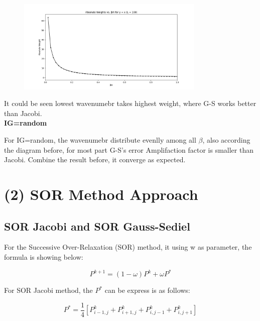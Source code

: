 \documentclass[12pt]{article}
\begin{document}
\begin{figure}[H]
    \centering
    \includegraphics[width=0.8\textwidth]{wavenmubers.png}
    \label{wavenmubers.png}
\end{figure}


It could be seen lowest wavenumebr takes highest weight, where G-S works better
than Jacobi.\\

\textbf{IG=random}

For IG=random, the wavenumebr distribute evenlly among all $\beta$, also according
the diagram before, for most part G-S's error Amplifaction factor is smaller than
Jacobi. Combine the result before, it converge as expected.







\section{(2) SOR Method Approach}
\subsection{SOR Jacobi and SOR Gauss-Sediel}

For the Successive Over-Relaxation (SOR) method, it using w as parameter,
the formula is showing below:


\begin{equation}
    P^{k+1} = (1-\omega)P^{k} + \omega P^*
\end{equation}
    




For SOR Jacobi method, the $P^*$ can be express is as follows:

\begin{equation}
    P^* = \frac{1}{4} \left[ P^{k}_{i-1,j} + P^{k}_{i+1,j} + P^{k}_{i,j-1} + P^{k}_{i,j+1} \right]
\end{equation}
\end{document}

